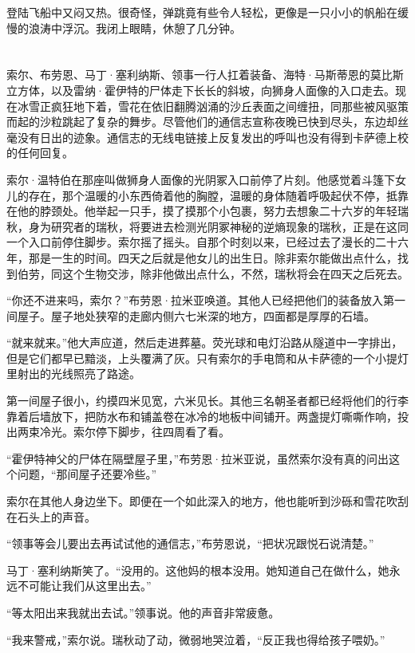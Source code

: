 \documentclass[AutoFakeBold=true]{book}
\begin{document}
登陆飞船中又闷又热。很奇怪，弹跳竟有些令人轻松，更像是一只小小的帆船在缓慢的浪涛中浮沉。我闭上眼睛，休憩了几分钟。

\chapter{}

索尔、布劳恩、马丁·塞利纳斯、领事一行人扛着装备、海特·马斯蒂恩的莫比斯立方体，以及雷纳·霍伊特的尸体走下长长的斜坡，向狮身人面像的入口走去。现在冰雪正疯狂地下着，雪花在依旧翻腾汹涌的沙丘表面之间缠扭，同那些被风驱策而起的沙粒跳起了复杂的舞步。尽管他们的通信志宣称夜晚已快到尽头，东边却丝毫没有日出的迹象。通信志的无线电链接上反复发出的呼叫也没有得到卡萨德上校的任何回复。

索尔·温特伯在那座叫做狮身人面像的光阴冢入口前停了片刻。他感觉着斗篷下女儿的存在，那个温暖的小东西倚着他的胸膛，温暖的身体随着呼吸起伏不停，抵靠在他的脖颈处。他举起一只手，摸了摸那个小包裹，努力去想象二十六岁的年轻瑞秋，身为研究者的瑞秋，将要进去检测光阴冢神秘的逆熵现象的瑞秋，正是在这同一个入口前停住脚步。索尔摇了摇头。自那个时刻以来，已经过去了漫长的二十六年，那是一生的时间。四天之后就是他女儿的出生日。除非索尔能做出点什么，找到伯劳，同这个生物交涉，{\kaishu 除非他做出点什么}，不然，瑞秋将会在四天之后死去。

``你还不进来吗，索尔？''布劳恩·拉米亚唤道。其他人已经把他们的装备放入第一间屋子。屋子地处狭窄的走廊内侧六七米深的地方，四面都是厚厚的石墙。

``就来就来。''他大声应道，然后走进葬墓。荧光球和电灯沿路从隧道中一字排出，但是它们都早已黯淡，上头覆满了灰。只有索尔的手电筒和从卡萨德的一个小提灯里射出的光线照亮了路途。

第一间屋子很小，约摸四米见宽，六米见长。其他三名朝圣者都已经将他们的行李靠着后墙放下，把防水布和铺盖卷在冰冷的地板中间铺开。两盏提灯嘶嘶作响，投出两束冷光。索尔停下脚步，往四周看了看。

``霍伊特神父的尸体在隔壁屋子里，''布劳恩·拉米亚说，虽然索尔没有真的问出这个问题，``那间屋子还要冷些。''

索尔在其他人身边坐下。即便在一个如此深入的地方，他也能听到沙砾和雪花吹刮在石头上的声音。

``领事等会儿要出去再试试他的通信志，''布劳恩说，``把状况跟悦石说清楚。''

马丁·塞利纳斯笑了。``没用的。这他妈的根本没用。她知道自己在做什么，她永远不可能让我们从这里出去。''

``等太阳出来我就出去试。''领事说。他的声音非常疲惫。

``我来警戒，''索尔说。瑞秋动了动，微弱地哭泣着，``反正我也得给孩子喂奶。''
\end{document}

